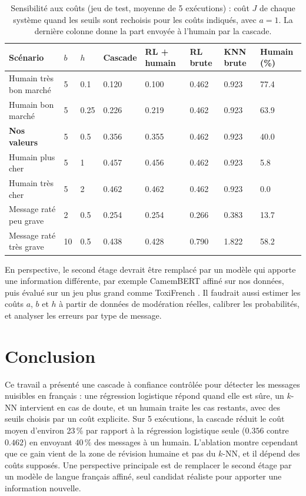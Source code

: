 \documentclass[a4paper,fleqn]{cas-sc}
\begin{document}
\begin{table}[width=\linewidth,cols=8,pos=h]
\caption{Sensibilité aux coûts (jeu de test, moyenne de 5 exécutions) : coût $J$ de chaque système quand les seuils
sont rechoisis pour les coûts indiqués, avec $a=1$. La dernière colonne donne la part envoyée à l'humain par la cascade.}
\label{tbl:sens}
\footnotesize
\begin{tabular*}{\tblwidth}{@{} LLLLLLLL @{} }
\toprule
Scénario & $b$ & $h$ & Cascade & RL + humain & RL brute & KNN brute & Humain (\%) \\
\midrule
Humain très bon marché & 5 & 0.1 & 0.120 & 0.100 & 0.462 & 0.923 & 77.4 \\
Humain bon marché & 5 & 0.25 & 0.226 & 0.219 & 0.462 & 0.923 & 63.9 \\
\textbf{Nos valeurs} & 5 & 0.5 & 0.356 & 0.355 & 0.462 & 0.923 & 40.0 \\
Humain plus cher & 5 & 1 & 0.457 & 0.456 & 0.462 & 0.923 & 5.8 \\
Humain très cher & 5 & 2 & 0.462 & 0.462 & 0.462 & 0.923 & 0.0 \\
Message raté peu grave & 2 & 0.5 & 0.254 & 0.254 & 0.266 & 0.383 & 13.7 \\
Message raté très grave & 10 & 0.5 & 0.438 & 0.428 & 0.790 & 1.822 & 58.2 \\
\bottomrule
\end{tabular*}
\end{table}

En perspective, le second étage devrait être remplacé par un modèle qui apporte une information différente,
par exemple CamemBERT \citep{Martin2020} affiné sur nos données, puis évalué sur un jeu plus grand comme
ToxiFrench \citep{Delaval2025}. Il faudrait aussi estimer les coûts $a$, $b$ et $h$ à partir de données de
modération réelles, calibrer les probabilités, et analyser les erreurs par type de message.

\section{Conclusion}

Ce travail a présenté une cascade à confiance contrôlée pour détecter les messages nuisibles en français :
une régression logistique répond quand elle est sûre, un $k$-NN intervient en cas de doute, et un humain
traite les cas restants, avec des seuils choisis par un coût explicite. Sur 5 exécutions, la cascade
réduit le coût moyen d'environ 23\,\% par rapport à la régression logistique seule ($0.356$ contre $0.462$)
en envoyant $40\,\%$ des messages à un humain. L'ablation montre cependant que ce gain vient de la zone de
révision humaine et pas du $k$-NN, et il dépend des coûts supposés. Une perspective principale est de
remplacer le second étage par un modèle de langue français affiné, seul candidat réaliste pour apporter une
information nouvelle.
\end{document}
